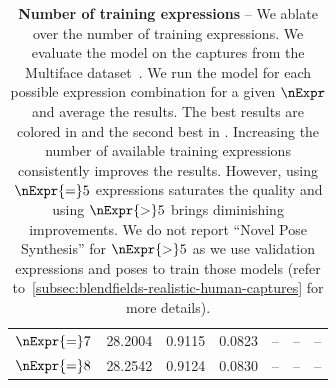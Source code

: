 \begin{table}[!t]
{\begin{tabular}{ccccccc}
      $\nExpr{=}7$                 & \cellcolor{secondbestcolor}28.2004     & \cellcolor{secondbestcolor}0.9115        & 0.0823                            & --                                 & --                                & --                                \\
      $\nExpr{=}8$                 & \cellcolor{firstbestcolor}28.2542      & \cellcolor{firstbestcolor}0.9124         & 0.0830                            & --                                 & --                                & --                                \\
      \bottomrule
    \end{tabular}
  }
  \caption[Ablation study showcasing how the number of training expressions affects the results in \blendfields]{\textbf{Number of training expressions} -- {
      We ablate over the number of training expressions.
      We evaluate the model on the captures from the Multiface
      dataset~\cite{wuu2022multiface}.
      We run the model for each possible expression combination for a given $\nExpr$
      and average the results.
      The best results are colored in  and the second
      best in .
      Increasing the number of available training expressions consistently improves
      the results.
      However, using $\nExpr{=}5$ expressions saturates the quality and using
      $\nExpr{>}5$ brings diminishing improvements.
      We do not report ``Novel Pose Synthesis'' for $\nExpr{>}5$ as we use
      validation expressions and poses to train those models (refer
      to~\cref{subsec:blendfields-realistic-human-captures} for more details).
    }
  }
  \label{tab:blendfields-ablation-num-expressions-fix}

\end{table}
